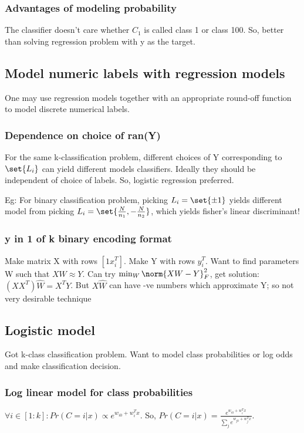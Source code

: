 \documentclass[oneside, article]{memoir}
\begin{document}
\subsubsection{Advantages of modeling probability}
The classifier doesn't care whether $C_{1}$ is called class 1 or class 100. So, better than solving regression problem with y as the target.

\subsection{Model numeric labels with regression models}
One may use regression models together with an appropriate round-off function to model discrete numerical labels.

\subsubsection{Dependence on choice of ran(Y)}
For the same k-classification problem, different choices of Y corresponding to $\set{L_{i}}$ can yield different models classifiers. Ideally they should be independent of choice of labels. So, logistic regression preferred.

Eg: For binary classification problem, picking $L_{i} = \set{\pm 1}$ yields different model from picking $L_{i} = \set{\frac{N}{n_{1}}, - \frac{N}{n_{2}}}$, which yields fisher's linear discriminant!

\subsubsection{y in 1 of k binary encoding format}
Make matrix X with rows $[1 x_{i}^{T}]$. Make Y with rows $y_{i}^{T}$. Want to find parameters W such that $XW \approx Y$. Can try $\min_{W} \norm{XW-Y}_{F}^{2}$, get solution: $(XX^{T})\hat{W} = X^{T}Y$. But $X\hat{W}$ can have -ve numbers which approximate Y; so not very desirable technique

\subsection{Logistic model}
Got k-class classification problem. Want to model class probabilities or log odds and make classification decision.

\subsubsection{Log linear model for class probabilities}
$\forall i \in [1:k]: Pr(C = i|x) \propto e^{w_{i0} + w_i^{T}x}$. So, $Pr(C = i|x) = \frac{e^{w_{i0} + w_i^{T}x}}{\sum_j e^{w_{j0} + w_j^{T}x}}$.
\end{document}
